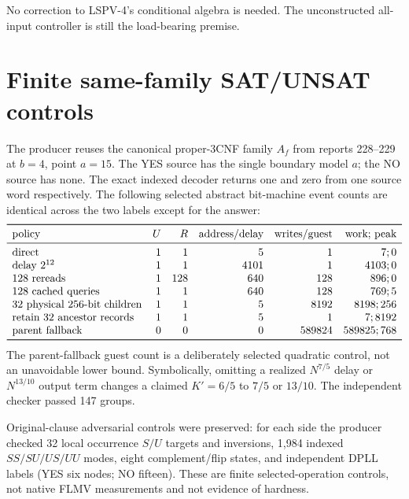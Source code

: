 \documentclass[11pt]{article}
\begin{document}
No correction to LSPV-4's conditional algebra is needed.  The unconstructed
all-input controller is still the load-bearing premise.

\section{Finite same-family SAT/UNSAT controls}
The producer reuses the canonical proper-3CNF family $A_f$ from reports 228--229
at $b=4$, point $a=15$.  The YES source has the single boundary model $a$;
the NO source has none.  The exact indexed decoder returns one and zero from
one source word respectively.  The following selected abstract bit-machine
event counts are identical across the two labels except for the answer:
\[
\begin{array}{lrrrrr}
\toprule
\text{policy}&U&R&\text{address/delay}&\text{writes/guest}&\text{work; peak}\\\midrule
\text{direct}&1&1&5&1&7;0\\
\text{delay }2^{12}&1&1&4101&1&4103;0\\
\text{128 rereads}&1&128&640&128&896;0\\
\text{128 cached queries}&1&1&640&128&769;5\\
\text{32 physical 256-bit children}&1&1&5&8192&8198;256\\
\text{retain 32 ancestor records}&1&1&5&1&7;8192\\
\text{parent fallback}&0&0&0&589824&589825;768\\
\bottomrule
\end{array}
\]
The parent-fallback guest count is a deliberately selected quadratic control,
not an unavoidable lower bound.  Symbolically, omitting a realized
$N^{7/5}$ delay or $N^{13/10}$ output term changes a claimed $K'=6/5$ to
$7/5$ or $13/10$.  The independent checker passed 147 groups.

Original-clause adversarial controls were preserved: for each side the producer
checked 32 local occurrence $S/U$ targets and inversions, 1,984 indexed
$SS/SU/US/UU$ modes, eight complement/flip states, and independent DPLL labels
(YES six nodes; NO fifteen).  These are finite selected-operation controls,
not native FLMV measurements and not evidence of hardness.
\end{document}
